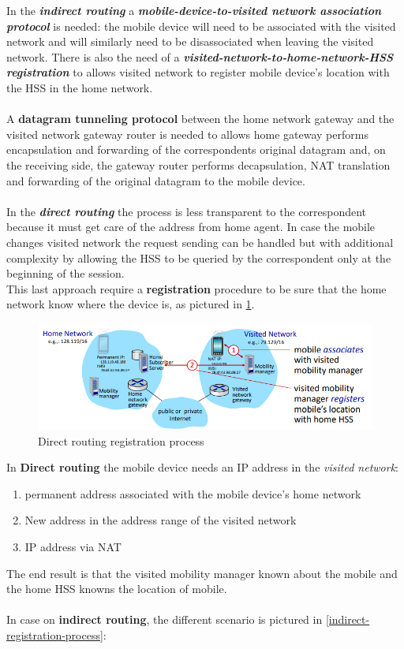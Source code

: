 \documentclass[10pt,a4paper]{report}
\theoremstyle{definition}
\begin{document}
In the \textit{\textbf{indirect routing}} a \textbf{\textit{mobile-device-to-visited network association protocol}} is needed: the mobile device will need to be associated with the visited network and will similarly need to be disassociated when leaving the visited network. There is also the need of a \textit{\textbf{visited-network-to-home-network-HSS registration}} to allows visited network to register mobile device's location with the HSS in the home network.\\\\
A \textbf{datagram tunneling protocol} between the home network gateway and the visited network gateway router is needed to allows home gateway performs encapsulation and forwarding of the correspondents original datagram and, on the receiving side, the gateway router performs decapsulation, NAT translation and forwarding of the original datagram to the mobile device.\\\\
In the \textit{\textbf{direct routing}} the process is less transparent to the correspondent because it must get care of the address from home agent. In case the mobile changes visited network the request sending can be handled but with additional complexity by allowing the HSS to be queried by the correspondent only at the beginning of the session.\\
This last approach require a \textbf{registration} procedure to be sure that the home network know where the device is, as pictured in \ref{registration-proc}.
\begin{figure}[h]
	\centering\includegraphics[scale=0.50]{images/Pasted image 20230322114404.png}
	\caption{Direct routing registration process}
	\label{registration-proc}
\end{figure}

In \textbf{Direct routing} the mobile device needs an IP address in the \textit{visited network}:
\begin{enumerate}
	\item 
	permanent address associated with the mobile device's home network
	\item 
	New address in the address range of the visited network
	\item 
	IP address via NAT
	
\end{enumerate}
The end result is that the visited mobility manager known about the mobile and the home HSS knowns the location of mobile.\\\\
In case on \textbf{indirect routing}, the different scenario is pictured in \ref{indirect-registration-process}:
\end{document}
